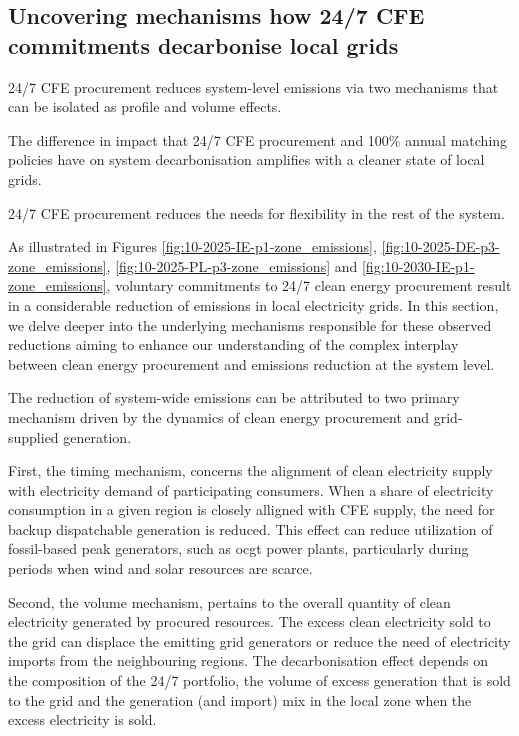 \subsection{Uncovering mechanisms how 24/7 CFE commitments decarbonise local grids}
\label{subsec:mechanisms}

\vspace{10pt}
\begin{res}
    24/7 CFE procurement reduces system-level \co emissions via two mechanisms that can be isolated as profile and volume effects.
\end{res}

\vspace{5pt}
\begin{res}
    The difference in impact that 24/7 CFE procurement and 100\% annual matching policies have on system decarbonisation amplifies with a cleaner state of local grids.
\end{res}

\vspace{5pt}
\begin{res}
    24/7 CFE procurement reduces the needs for flexibility in the rest of the system.
\end{res}
   
As illustrated in Figures \ref{fig:10-2025-IE-p1-zone_emissions}, \ref{fig:10-2025-DE-p3-zone_emissions}, \ref{fig:10-2025-PL-p3-zone_emissions} and \ref{fig:10-2030-IE-p1-zone_emissions}, voluntary commitments to 24/7 clean energy procurement result in a considerable reduction of \co emissions in local electricity grids. 
In this section, we delve deeper into the underlying mechanisms responsible for these observed reductions aiming to enhance our understanding of the complex interplay between clean energy procurement and emissions reduction at the system level.

The reduction of system-wide emissions can be attributed to two primary mechanism driven by the dynamics of clean energy procurement and grid-supplied generation.

First, the timing mechanism, concerns the alignment of clean electricity supply with electricity demand of participating consumers. When a share of electricity consumption in a given region is closely alligned with CFE supply, the need for backup dispatchable generation is reduced. This effect can reduce utilization of fossil-based peak generators, such as \gls{ocgt} power plants, particularly during periods when wind and solar resources are scarce. 

Second, the volume mechanism, pertains to the overall quantity of clean electricity generated by procured resources. 
The excess clean electricity sold to the grid can displace the emitting grid generators or reduce the need of electricity imports from the neighbouring regions.
The decarbonisation effect depends on the composition of the 24/7 portfolio, the volume of excess generation that is sold to the grid and the generation (and import) mix in the local zone when the excess electricity is sold.

